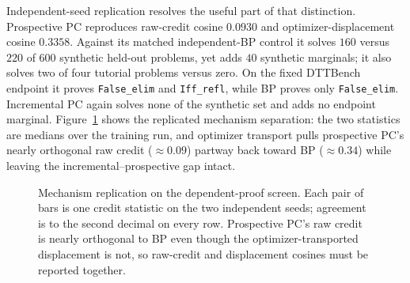 \documentclass[11pt]{article}
\newcommand{\code}[1]{\texttt{#1}}
\begin{document}
Independent-seed replication resolves the useful part of that distinction. Prospective
PC reproduces raw-credit cosine $0.0930$ and optimizer-displacement cosine $0.3358$.
Against its matched independent-BP control it solves $160$ versus $220$ of $600$
synthetic held-out problems, yet adds $40$ synthetic marginals; it also solves two of
four tutorial problems versus zero. On the fixed DTTBench endpoint it proves
\code{False\_elim} and \code{Iff\_refl}, while BP proves only
\code{False\_elim}. Incremental PC again solves none of the synthetic set and adds no
endpoint marginal. Figure~\ref{fig:nn-dtt-cosines} shows the replicated mechanism
separation: the two statistics are medians over the training run, and optimizer
transport pulls prospective PC's nearly orthogonal raw credit ($\approx 0.09$)
partway back toward BP ($\approx 0.34$) while leaving the incremental--prospective
gap intact.

\begin{figure}[htbp]
\centering
{}
\caption{Mechanism replication on the dependent-proof screen. Each pair of bars is
one credit statistic on the two independent seeds; agreement is to the second
decimal on every row. Prospective PC's raw credit is nearly orthogonal to BP even
though the optimizer-transported displacement is not, so raw-credit and displacement
cosines must be reported together.}
\label{fig:nn-dtt-cosines}
\end{figure}
\end{document}
